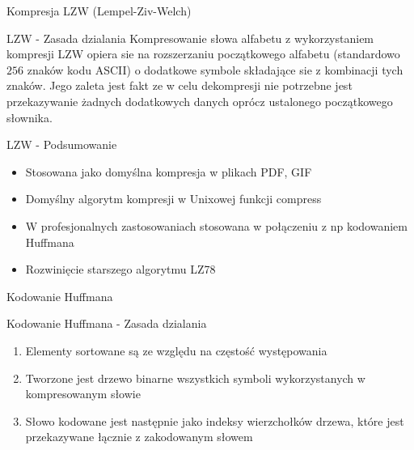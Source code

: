 \documentclass[aspectratio=169]{beamer}
\begin{document}
    \begin{frame}[plain,c]
        \begin{center}
            \Large Kompresja LZW (Lempel-Ziv-Welch)
        \end{center}
    \end{frame}

    
    \begin{frame}{LZW - Zasada dzialania}
        Kompresowanie słowa alfabetu z wykorzystaniem kompresji LZW opiera sie na rozszerzaniu początkowego alfabetu (standardowo $256$ znaków kodu ASCII) o dodatkowe symbole składające sie z kombinacji tych znaków. Jego zaleta jest fakt ze w celu dekompresji nie potrzebne jest przekazywanie żadnych dodatkowych danych oprócz ustalonego początkowego słownika.
    \end{frame}

    \begin{frame}{LZW - Podsumowanie}
        \begin{itemize}
            \item Stosowana jako domyślna kompresja w plikach PDF, GIF 
            \item Domyślny algorytm kompresji w Unixowej funkcji compress
            \item W profesjonalnych zastosowaniach stosowana w połączeniu z np kodowaniem Huffmana
            \item Rozwinięcie starszego algorytmu LZ78
        \end{itemize}

    \end{frame}


    \begin{frame}[plain,c]
        \begin{center}
            \Large Kodowanie Huffmana
        \end{center}
    \end{frame}
    
    
    \begin{frame}{Kodowanie Huffmana - Zasada dzialania}
        \begin{enumerate}
            \item Elementy sortowane są ze względu na częstość występowania
            \item Tworzone jest drzewo binarne wszystkich symboli wykorzystanych w kompresowanym słowie
            \item Słowo kodowane jest następnie jako indeksy wierzchołków drzewa, które jest przekazywane łącznie z zakodowanym słowem
        \end{enumerate}
    \end{frame}
    
\end{document}
